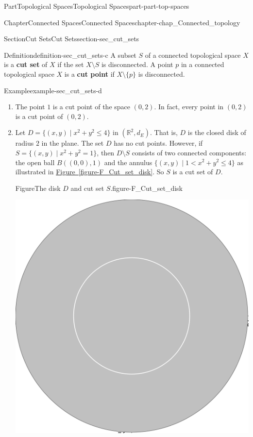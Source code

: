 \documentclass[oneside,10pt,]{book}
\newcommand{\xreffont}{\relax}
\newcommand{\terminology}[1]{\textbf{#1}}
\numberwithin{equation}{chapter}
\newcommand{\R}{\mathbb{R}}
\newcommand{\lt}{<}
\begin{document}
\begin{partptx}{Part}{Topological Spaces}{}{Topological Spaces}{}{}{part-part-top-spaces}
\begin{chapterptx}{Chapter}{Connected Spaces}{}{Connected Spaces}{}{}{chapter-chap_Connected_topology}
\begin{sectionptx}{Section}{Cut Sets}{}{Cut Sets}{}{}{section-sec_cut_sets}
\begin{definition}{Definition}{}{definition-sec_cut_sets-c}%
%
%
A subset \(S\) of a connected topological space \(X\) is a \terminology{cut set} of \(X\) if the set \(X \setminus S\) is disconnected. A point \(p\) in a connected topological space \(X\) is a \terminology{cut point} if \(X \setminus \{p\}\) is disconnected.%
\end{definition}
\begin{example}{Example}{}{example-sec_cut_sets-d}%
\begin{enumerate}[font=\bfseries,label=(\alph*),ref=\alph*]%
\item{}The point \(1\) is a cut point of the space \((0,2)\). In fact, every point in \((0,2)\) is a cut point of \((0,2)\).%
\item{}Let \(D = \{(x,y) \mid x^2+y^2 \leq 4\}\) in \((\R^2, d_E)\). That is, \(D\) is the closed disk of radius \(2\) in the plane. The set \(D\) has no cut points. However, if \(S = \{(x,y) \mid x^2+y^2 = 1\}\), then \(D \setminus S\) consists of two connected components: the open ball \(B((0,0),1)\) and the annulus \(\{(x,y) \mid 1 \lt x^2+y^2 \leq 4\}\) as illustrated in \hyperref[figure-F_Cut_set_disk]{Figure~{\xreffont\ref{figure-F_Cut_set_disk}}}. So \(S\) is a cut set of \(D\).%
\begin{figureptx}{Figure}{The disk \(D\) and cut set \(S\).}{figure-F_Cut_set_disk}{}%
\begin{image}{0.25}{0.5}{0.25}{}%
\includegraphics[width=\linewidth]{external/Cut_set_disk.pdf}

\end{image}
\end{figureptx}
\end{enumerate}
\end{example}
\end{sectionptx}
\end{chapterptx}
\end{partptx}
\end{document}
